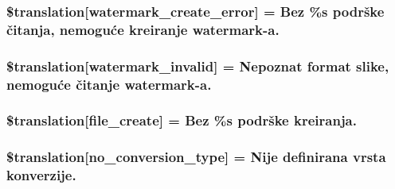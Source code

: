 \subsubsection[{\$translation}]{\setlength{\rightskip}{0pt plus 5cm}\$translation\mbox{[}\textquotesingle{}watermark\+\_\+create\+\_\+error\textquotesingle{}\mbox{]} = \textquotesingle{}Bez \%s podrške čitanja, nemoguće kreiranje watermark-\/a.\textquotesingle{}}\label{class_8upload_8hr___h_r_8php_aabca0b65dadbc6184415c16375f284ca}
\hypertarget{class_8upload_8hr___h_r_8php_ac336e7a5701e47ba4a05e9e498a3cc44}{}
\subsubsection[{\$translation}]{\setlength{\rightskip}{0pt plus 5cm}\$translation\mbox{[}\textquotesingle{}watermark\+\_\+invalid\textquotesingle{}\mbox{]} = \textquotesingle{}Nepoznat format slike, nemoguće čitanje watermark-\/a.\textquotesingle{}}\label{class_8upload_8hr___h_r_8php_ac336e7a5701e47ba4a05e9e498a3cc44}
\hypertarget{class_8upload_8hr___h_r_8php_a1ecb4673e4fb69e06b3f20b65cecf30a}{}
\subsubsection[{\$translation}]{\setlength{\rightskip}{0pt plus 5cm}\$translation\mbox{[}\textquotesingle{}file\+\_\+create\textquotesingle{}\mbox{]} = \textquotesingle{}Bez \%s podrške kreiranja.\textquotesingle{}}\label{class_8upload_8hr___h_r_8php_a1ecb4673e4fb69e06b3f20b65cecf30a}
\hypertarget{class_8upload_8hr___h_r_8php_a4712d7ec28e9a7f17eb3338af2358363}{}
\subsubsection[{\$translation}]{\setlength{\rightskip}{0pt plus 5cm}\$translation\mbox{[}\textquotesingle{}no\+\_\+conversion\+\_\+type\textquotesingle{}\mbox{]} = \textquotesingle{}Nije definirana vrsta konverzije.\textquotesingle{}}\label{class_8upload_8hr___h_r_8php_a4712d7ec28e9a7f17eb3338af2358363}
\hypertarget{class_8upload_8hr___h_r_8php_a783c9358bcf54a054545b50098bc679b}{}
